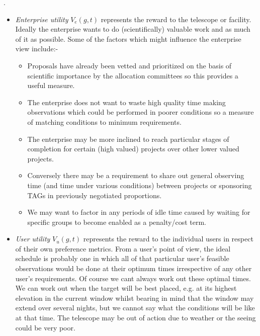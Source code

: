 . %
\begin{itemize}
\item \emph{Enterprise utility} $V_e(g,t)$  represents the reward to the telescope or facility. Ideally the enterprise wants to do (scientifically) valuable work and as much of it as possible. Some of the factors which might influence the enterprise view include:-
\begin{itemize}
\item Proposals have already been vetted and prioritized on the basis of scientific importance by the allocation committees so this provides a useful measure.
\item The enterprise does not want to waste high quality time making observations which could be performed in poorer conditions so a measure of matching conditions to minimum requirements.
\item The enterprise may be more inclined to reach particular stages of completion for certain (high valued) projects over other lower valued projects.
\item Conversely there may be a requirement to share out general observing time (and time under various conditions) between projects or sponsoring TAGs in previously negotiated proportions.
\item We may want to factor in any periods of idle time caused by waiting for specific groups to become enabled as a penalty/cost term.
\end{itemize}

\item \emph{User utility}  $V_u(g,t)$  represents the reward to the individual users in respect of their own preference metrics. From a user's point of view, the ideal schedule is probably one in which all of that particular user's feasible observations would be done at their optimum times irrespective of any other user's requirements. Of course we cant always work out these optimal times. We can work out when the target will be best placed, e.g. at its highest elevation in the current window whilst bearing in mind that the window may extend over several nights, but we cannot say what the conditions will be like at that time. The telescope may be out of action due to weather or the seeing could be very poor. 


\end{itemize}
